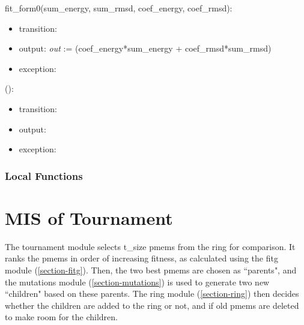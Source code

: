 \documentclass[12pt, titlepage]{article}
\begin{document}
\noindent fit\_form0(sum\_energy, sum\_rmsd, coef\_energy, coef\_rmsd):
\begin{itemize}
	\item transition:  
	\item output: \textit{out} := (coef\_energy*sum\_energy + 
	coef\_rmsd*sum\_rmsd)
	\item exception:  
\end{itemize}

\noindent {}():
\begin{itemize}
	\item transition:  
	\item output:  
	\item exception:  
\end{itemize}



\subsubsection{Local Functions}

 

\newpage

\section{MIS of Tournament} \label{section-tournament} 

The tournament module selects t\_size pmems from the ring for comparison. It 
ranks the pmems in order of increasing fitness, as calculated using the fitg 
module (\ref{section-fitg}). Then, the two best pmems are chosen as ``parents", 
and the mutations module (\ref{section-mutations}) is used to generate two new 
``children" based on these parents. The ring module (\ref{section-ring}) then 
decides whether the children are added to the ring or not, and if old pmems are 
deleted to make room for the children.
\end{document}
